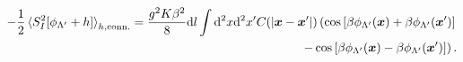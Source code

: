 \begin{align}
    -\frac12\braket{S^2_I[\phi_{\Lambda'}+h]}_{h,{\rm conn.}} = \frac{g^2K\beta^2}8\mathrm d l\int\mathrm d^2x\mathrm d^2x'
    C(|{\bm x}-{\bm x'}|)
    \left(
        \cos\left[ \beta\phi_{\Lambda'}({\bm x})+\beta\phi_{\Lambda'}({\bm x'}) \right]
        \right.
        \\
        \left.-
        \cos\left[ \beta\phi_{\Lambda'}({\bm x})-\beta\phi_{\Lambda'}({\bm x'}) \right]
    \right).
\end{align}


